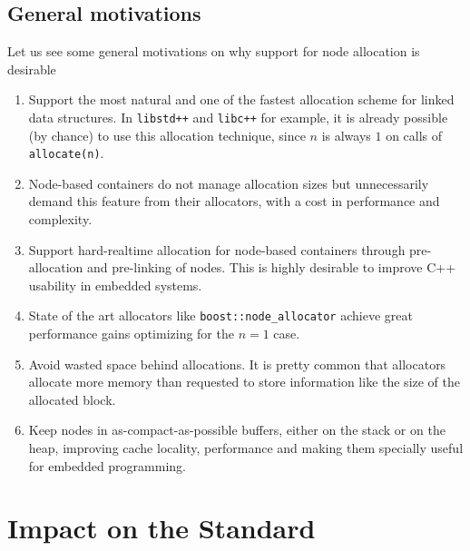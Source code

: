 \documentclass[11pt]{article}
\begin{document}
\subsection{General motivations}

Let us see some general motivations on why support for node allocation is
desirable

\begin{enumerate}

\item Support the most natural and one of the fastest allocation
scheme for linked data structures. In \texttt{libstd++} and
\texttt{libc++} for example, it is already possible (by chance) to use
this allocation technique, since $n$ is always $1$ on calls of
\texttt{allocate(n)}.

\item Node-based containers do not manage allocation sizes but
unnecessarily demand this feature from their allocators, with a cost
in performance and complexity.


\item Support hard-realtime allocation for node-based containers
through pre-allocation and pre-linking of nodes. This is highly
desirable to improve C++ usability in embedded systems.

\item State of the art allocators like \texttt{boost::node\_allocator}
\cite{boost} achieve great performance gains optimizing for the $n = 1$ case. 

\item Avoid wasted space behind allocations. It is pretty common that
allocators allocate more memory than requested to store information
like the size of the allocated block.

\item Keep nodes in as-compact-as-possible buffers, either on the
stack or on the heap, improving cache locality, performance and making
them specially useful for embedded programming.

\end{enumerate}

\section{Impact on the Standard} \label{impact}
\end{document}
